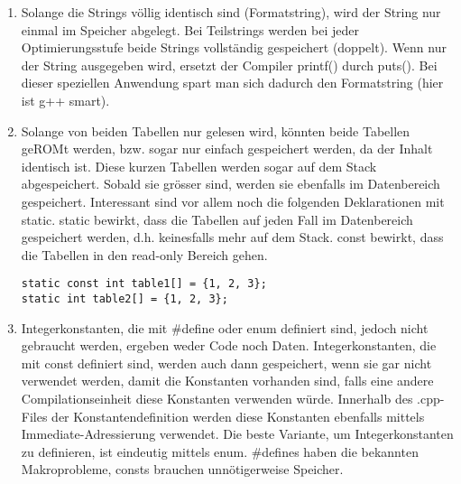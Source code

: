 \begin{enumerate}
  \item Solange die Strings völlig identisch sind (Formatstring), wird der String nur einmal im Speicher abgelegt. Bei Teilstrings werden bei jeder Optimierungsstufe beide Strings vollständig gespeichert (doppelt). Wenn nur der String ausgegeben wird, ersetzt der Compiler printf() durch puts(). Bei dieser speziellen Anwendung spart man sich dadurch den Formatstring (hier ist g++ smart).

\noindent\makebox[\linewidth]{\rule{\paperwidth}{0.4pt}}

\noindent\makebox[\linewidth]{\rule{\paperwidth}{0.4pt}}
  \item Solange von beiden Tabellen nur gelesen wird, könnten beide Tabellen geROMt werden, bzw. sogar nur einfach gespeichert werden, da der Inhalt identisch ist. Diese kurzen Tabellen werden sogar auf dem Stack abgespeichert. Sobald sie grösser sind, werden sie ebenfalls im Datenbereich gespeichert. Interessant sind vor allem noch die folgenden Deklarationen mit static. static bewirkt, dass die Tabellen auf jeden Fall im Datenbereich gespeichert werden, d.h. keinesfalls mehr auf dem Stack. const bewirkt, dass die Tabellen in den read-only Bereich gehen.

\texttt{static const int table1[] = \{1, 2, 3\};\\
static int table2[] = \{1, 2, 3\};}



\noindent\makebox[\linewidth]{\rule{\paperwidth}{0.4pt}}

\noindent\makebox[\linewidth]{\rule{\paperwidth}{0.4pt}}

  \item Integerkonstanten, die mit \#define oder enum definiert sind, jedoch nicht gebraucht werden, ergeben weder Code noch Daten. Integerkonstanten, die mit const definiert sind, werden auch dann gespeichert, wenn sie gar nicht verwendet werden, damit die Konstanten vorhanden sind, falls eine andere Compilationseinheit diese Konstanten verwenden würde. Innerhalb des .cpp-Files der Konstantendefinition werden diese Konstanten ebenfalls mittels Immediate-Adressierung verwendet. Die beste Variante, um Integerkonstanten zu definieren, ist eindeutig mittels enum. \#defines haben die bekannten Makroprobleme, consts brauchen unnötigerweise Speicher.


\end{enumerate}
